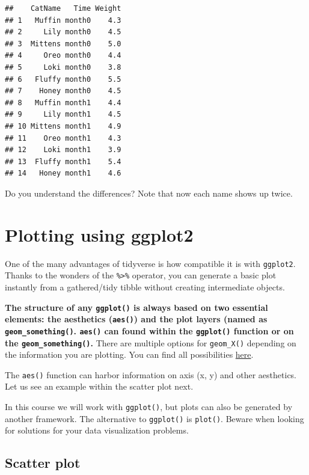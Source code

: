 \documentclass[
]{book}
\begin{document}
\begin{verbatim}
##    CatName   Time Weight
## 1   Muffin month0    4.3
## 2     Lily month0    4.5
## 3  Mittens month0    5.0
## 4     Oreo month0    4.4
## 5     Loki month0    3.8
## 6   Fluffy month0    5.5
## 7    Honey month0    4.5
## 8   Muffin month1    4.4
## 9     Lily month1    4.5
## 10 Mittens month1    4.9
## 11    Oreo month1    4.3
## 12    Loki month1    3.9
## 13  Fluffy month1    5.4
## 14   Honey month1    4.6
\end{verbatim}

Do you understand the differences?
Note that now each name shows up twice.

\hypertarget{plotting-using-ggplot2}{%
\section*{Plotting using ggplot2}\label{plotting-using-ggplot2}}

One of the many advantages of tidyverse is how compatible it is with \texttt{ggplot2}.
Thanks to the wonders of the \texttt{\%\textgreater{}\%} operator, you can generate a basic plot instantly from a gathered/tidy tibble without creating intermediate objects.

\textbf{The structure of any \texttt{ggplot()} is always based on two essential elements: the aesthetics (\texttt{aes()}) and the plot layers (named as \texttt{geom\_something()}. \texttt{aes()} can found within the \texttt{ggplot()} function or on the \texttt{geom\_something()}.} There are multiple options for \texttt{geom\_X()} depending on the information you are plotting.
You can find all possibilities \href{https://ggplot2.tidyverse.org/reference/}{here}.

The \texttt{aes()} function can harbor information on axis (x, y) and other aesthetics.
Let us see an example within the scatter plot next.

In this course we will work with \texttt{ggplot()}, but plots can also be generated by another framework.
The alternative to \texttt{ggplot()} is \texttt{plot()}.
Beware when looking for solutions for your data visualization problems.

\hypertarget{scatter-plot}{%
\subsection*{Scatter plot}\label{scatter-plot}}
\end{document}
